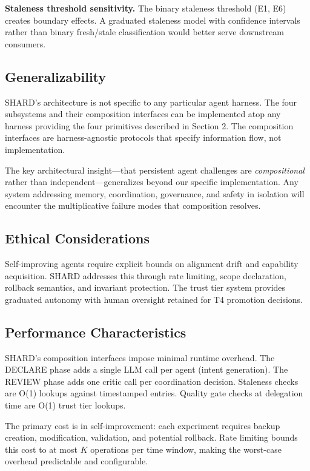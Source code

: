 \documentclass[11pt]{article}
\begin{document}
\textbf{Staleness threshold sensitivity.} The binary staleness threshold (E1, E6) creates boundary effects. A graduated staleness model with confidence intervals rather than binary fresh/stale classification would better serve downstream consumers.

\subsection{Generalizability}

SHARD's architecture is not specific to any particular agent harness. The four subsystems and their composition interfaces can be implemented atop any harness providing the four primitives described in Section 2. The composition interfaces are harness-agnostic protocols that specify information flow, not implementation.

The key architectural insight---that persistent agent challenges are \emph{compositional} rather than independent---generalizes beyond our specific implementation. Any system addressing memory, coordination, governance, and safety in isolation will encounter the multiplicative failure modes that composition resolves.

\subsection{Ethical Considerations}

Self-improving agents require explicit bounds on alignment drift and capability acquisition. SHARD addresses this through rate limiting, scope declaration, rollback semantics, and invariant protection. The trust tier system provides graduated autonomy with human oversight retained for T4 promotion decisions.

\subsection{Performance Characteristics}

SHARD's composition interfaces impose minimal runtime overhead. The DECLARE phase adds a single LLM call per agent (intent generation). The REVIEW phase adds one critic call per coordination decision. Staleness checks are O(1) lookups against timestamped entries. Quality gate checks at delegation time are O(1) trust tier lookups.

The primary cost is in self-improvement: each experiment requires backup creation, modification, validation, and potential rollback. Rate limiting bounds this cost to at most $K$ operations per time window, making the worst-case overhead predictable and configurable.
\end{document}

